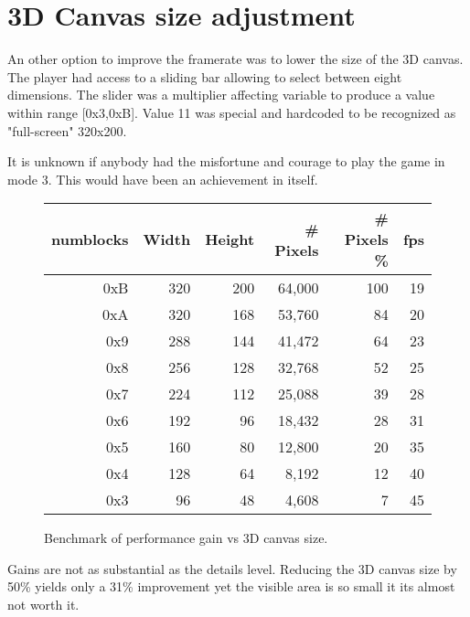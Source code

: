 \vspace{-30pt}
\section{3D Canvas size adjustment}
An other option to improve the framerate was to lower the size of the 3D canvas. The player had access to a sliding bar allowing to select between eight dimensions. The slider was a multiplier affecting variable  to produce a value within range [0x3,0xB]. Value 11 was special and hardcoded to be recognized as "full-screen" 320x200.\\
\par
\vspace{4mm}
\par
It is unknown if anybody had the misfortune and courage to play the game in mode 3. This would have been an achievement in itself.\\
\par
{}
\par
{}

\begin{figure}[H]
\centering  
\begin{tabularx}{\textwidth}{ R{1}  R{1} R{1} R{1}  R{1.4}  R{0.6} }
  \toprule
  \textbf{numblocks} & \textbf{Width} & \textbf{Height} & \textbf{\# Pixels} & \textbf{\# Pixels \%} & \textbf{fps}\\
  \toprule 

 0xB & 320 & 200 & 64,000 & 100 & 19 \\
 0xA & 320 & 168 & 53,760 &  84 & 20 \\
 0x9 & 288 & 144 & 41,472 &  64 & 23 \\
 0x8 & 256 & 128 & 32,768 &  52 & 25 \\
0x7 & 224 & 112 & 25,088 &  39 & 28 \\
 0x6 & 192 & 96 & 18,432 &  28 & 31  \\
 0x5 & 160 & 80 & 12,800 &  20 & 35  \\
 0x4 & 128 & 64 &  8,192 &  12 & 40  \\
 0x3 &  96 & 48 &  4,608 &   7 & 45  \\
   \toprule
\end{tabularx}
\caption{Benchmark of performance gain vs 3D canvas size.\protect\footnotemark}
\end{figure}

\par
Gains are not as substantial as the details level. Reducing the 3D canvas size by 50\% yields only a 31\% improvement yet the visible area is so small it its almost not worth it.\\

\par
{}

